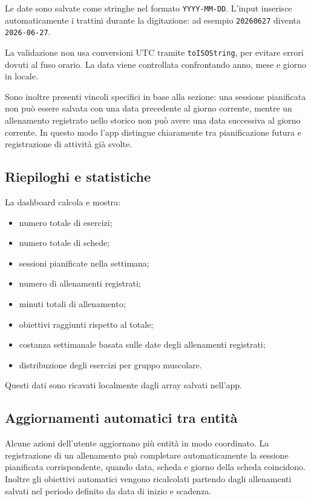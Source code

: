 \documentclass[11pt,a4paper]{article}
\begin{document}
Le date sono salvate come stringhe nel formato \texttt{YYYY-MM-DD}. L'input inserisce automaticamente i trattini durante la digitazione: ad esempio \texttt{20260627} diventa \texttt{2026-06-27}.

La validazione non usa conversioni UTC tramite \texttt{toISOString}, per evitare errori dovuti al fuso orario. La data viene controllata confrontando anno, mese e giorno in locale.

Sono inoltre presenti vincoli specifici in base alla sezione: una sessione pianificata non può essere salvata con una data precedente al giorno corrente, mentre un allenamento registrato nello storico non può avere una data successiva al giorno corrente. In questo modo l'app distingue chiaramente tra pianificazione futura e registrazione di attività già svolte.

\subsection{Riepiloghi e statistiche}

La dashboard calcola e mostra:

\begin{itemize}
  \item numero totale di esercizi;
  \item numero totale di schede;
  \item sessioni pianificate nella settimana;
  \item numero di allenamenti registrati;
  \item minuti totali di allenamento;
  \item obiettivi raggiunti rispetto al totale;
  \item costanza settimanale basata sulle date degli allenamenti registrati;
  \item distribuzione degli esercizi per gruppo muscolare.
\end{itemize}

Questi dati sono ricavati localmente dagli array salvati nell'app.

\subsection{Aggiornamenti automatici tra entità}

Alcune azioni dell'utente aggiornano più entità in modo coordinato. La registrazione di un allenamento può completare automaticamente la sessione pianificata corrispondente, quando data, scheda e giorno della scheda coincidono. Inoltre gli obiettivi automatici vengono ricalcolati partendo dagli allenamenti salvati nel periodo definito da data di inizio e scadenza.
\end{document}
